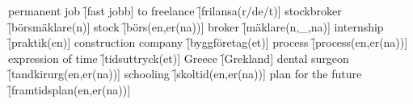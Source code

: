 \begin{questions}
\begin{multicols}{2}
        \question permanent job \f[fast jobb]
        \question to freelance \f[frilansa(r/de/t)]
        \question stockbroker \f[börsmäklare(n)]
        \question stock \f[börs(en,er(na))]
        \question broker \f[mäklare(n,\_,na)]
        \question internship \f[praktik(en)]
        \question construction company \f[byggföretag(et)]
        \question process \f[process(en,er(na))]
        \question expression of time \f[tidsuttryck(et)]
        \question Greece \f[Grekland]
        \question dental surgeon \f[tandkirurg(en,er(na))]
        \question schooling \f[skoltid(en,er(na))]
        \question plan for the future \f[framtidsplan(en,er(na))]
    \end{multicols}
\end{questions}
